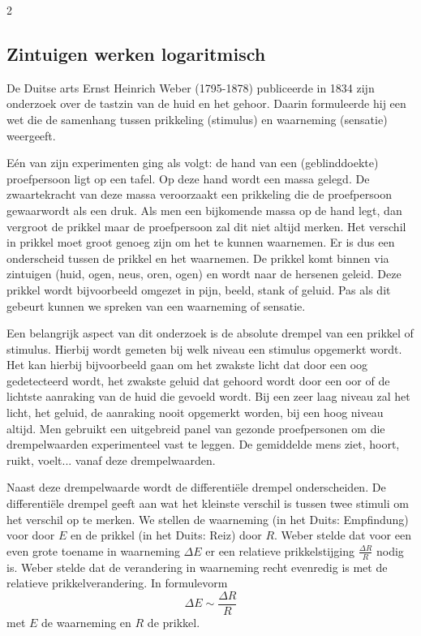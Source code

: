 \begin{multicols}{2}


\subsection{Zintuigen werken logaritmisch}
De Duitse arts Ernst Heinrich Weber (1795-1878) publiceerde in 1834 zijn onderzoek over de tastzin van de huid en het gehoor. Daarin formuleerde hij een wet die de samenhang tussen prikkeling (stimulus) en waarneming (sensatie)  weergeeft.

Eén van zijn experimenten ging als volgt: de hand van een (geblinddoekte) proefpersoon ligt op een tafel. Op deze hand wordt een massa gelegd. De zwaartekracht van deze massa veroorzaakt een prikkeling die de proefpersoon gewaarwordt als een druk. Als men een bijkomende massa op de hand legt, dan vergroot de prikkel maar de proefpersoon zal dit niet altijd merken. Het verschil in prikkel moet groot genoeg zijn om het te kunnen waarnemen. Er is dus een onderscheid tussen de prikkel en het waarnemen. De prikkel komt binnen via zintuigen (huid, ogen, neus, oren, ogen) en wordt naar de hersenen geleid. Deze prikkel wordt bijvoorbeeld omgezet in pijn, beeld, stank of geluid. Pas als dit gebeurt kunnen we spreken van een waarneming of sensatie.

Een belangrijk aspect van dit onderzoek is de absolute drempel van een prikkel of stimulus. Hierbij wordt gemeten bij welk niveau een stimulus opgemerkt wordt. Het kan hierbij bijvoorbeeld gaan om het zwakste licht dat door een oog gedetecteerd wordt, het zwakste geluid dat gehoord wordt door een oor of de lichtste aanraking van de huid die gevoeld wordt. Bij een zeer laag niveau zal het licht, het geluid, de aanraking nooit opgemerkt worden, bij een hoog niveau altijd. Men gebruikt een uitgebreid panel van gezonde proefpersonen om die drempelwaarden experimenteel vast te leggen. De gemiddelde mens ziet, hoort, ruikt, voelt... vanaf deze drempelwaarden.

Naast deze drempelwaarde wordt de differentiële drempel onderscheiden. De differentiële drempel geeft aan wat het kleinste verschil is tussen twee stimuli om het verschil op te merken.  We stellen de waarneming (in het Duits: Empfindung) voor door $E$  en de prikkel (in het Duits: Reiz) door $R$.  Weber stelde dat voor een even grote toename in waarneming $\Delta E$ er een relatieve prikkelstijging $\frac{\Delta R}{R}$ nodig is. Weber stelde dat de verandering in waarneming recht evenredig is met de relatieve prikkelverandering.  In formulevorm
\[\Delta E\sim \frac{\Delta R}{R}\]
met $E$ de waarneming en $R$ de prikkel.


\end{multicols}
